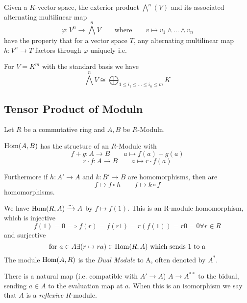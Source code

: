 \begin{definition}
   Given a \(K\)-vector space, the exterior product \(\bigwedge^n(V)\) and its associated alternating multilinear map
   \[\varphi: V^n \to \bigwedge^nV \qquad\text{where}\qquad v \mapsto v_1 \wedge \ldots \wedge v_n\]
   have the property that for a vector space \(T\), any alternating multilinear map \(h: V^n \to T\) factors through \(\varphi\) uniquely i.e.
   \begin{center}
   \end{center}
\end{definition}
\begin{remark}
   For \(V = K^m\) with the standard basis we have
   \[\bigwedge^nV \cong \bigoplus_{1 \leq i_1 \leq \ldots \leq i_n \leq m}K\]
\end{remark}

\subsection{Tensor Product of Moduln}
\begin{proposition}
   Let \(R\) be a commutative ring and \(A, B\) be \(R\)-Moduln.

   \(\operatorname{Hom}(A, B)\) has the structure of an \(R\)-Module with
   \[f+g: A \to B \qquad a \mapsto f(a) + g(a)\]
   \[r \cdot f: A \to B \qquad a \mapsto r \cdot f(a)\]

   Furthermore if \(h: A' \to A\) and \(k: B' \to B\) are homomorphisms, then are
   \[f \mapsto f \circ h \qquad f \mapsto k \circ f\]
   homomorphisms.
\end{proposition}
\begin{example}
   We have \(\operatorname{Hom}(R, A) \xrightarrow{\sim} A\) by \(f \mapsto f(1)\).
   This is an R-module homomorphism, which is injective
   \[f(1) = 0 \implies f(r) = f(r1) = r(f(1)) = r0 = 0 \forall r \in R\]
   and surjective
   \[\text{for}~a \in A \exists (r \mapsto ra) \in \operatorname{Hom}(R, A)~\text{which sends 1 to a}\]
   The module \(\operatorname{Hom}(A, R)\) is the \emph{Dual Module} to A, often denoted by \(A^\ast\).

   There is a natural map (i.e. compatible with \(A' \to A\)) \(A \to A^{\ast\ast}\) to the bidual, sending \(a \in A\) to the evaluation map at \(a\).
   When this is an isomorphism we say that \(A\) is a \emph{reflexive} \(R\)-module.
\end{example}
